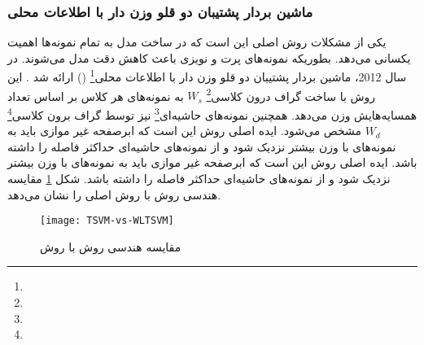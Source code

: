 \subsubsection{ماشین بردار پشتیبان دو قلو وزن دار با اطلاعات محلی }\label{sec:2:2:3:3}
یکی از مشکلات روش  اصلی این است که در ساخت مدل به تمام نمونه‌ها اهمیت یکسانی می‌دهد. بطوریکه نمونه‌های پرت و نویزی باعث کاهش دقت مدل می‌شوند. در سال 2012، ماشین بردار پشتیبان دو قلو وزن دار با اطلاعات محلی\footnote{}  () ارائه شد \cite{ye2012}. این روش با ساخت گراف درون کلاسی\footnote{}  $W_{s}$  به نمونه‌های هر کلاس بر اساس تعداد همسایه‌هایش وزن می‌دهد. همچنین نمونه‌های حاشیه‌ای\footnote{}  نیز توسط گراف برون کلاسی\footnote{}  $W_d$ مشخص می‌شود. ایده اصلی روش  این است که ابرصفحه غیر موازی باید به نمونه‌های با وزن بیشتر نزدیک شود و از نمونه‌های حاشیه‌ای حداکثر فاصله را داشته باشد. ایده اصلی روش  این است که ابرصفحه غیر موازی باید به نمونه‌های با وزن بیشتر نزدیک شود و از نمونه‌های حاشیه‌ای حداکثر فاصله را داشته باشد. شکل \ref{fig:TSVM-WLTSVM} مقایسه هندسی روش  با روش  اصلی را نشان می‌دهد.   

\begin{figure}[!t]
	\centering
	\texttt{[image: TSVM-vs-WLTSVM]}
	\caption{مقایسه هندسی روش  با روش  }
	\label{fig:TSVM-WLTSVM}
\end{figure}


